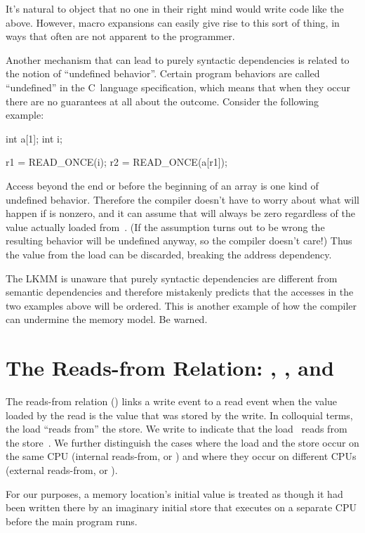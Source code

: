 It's natural to object that no one in their right mind would write
code like the above.
However, macro expansions can easily give rise to this sort of thing,
in ways that often are not apparent to the programmer.

Another mechanism that can lead to purely syntactic dependencies is
related to the notion of ``undefined behavior''.
Certain program behaviors are called ``undefined'' in the C~language
specification, which means that when they occur there are no
guarantees at all about the outcome.
Consider the following example:

\begin{VerbatimU}
	int a[1];
	int i;

	r1 = READ_ONCE(i);
	r2 = READ_ONCE(a[r1]);
\end{VerbatimU}

Access beyond the end or before the beginning of an array is one kind
of undefined behavior.
Therefore the compiler doesn't have to worry about what will happen
if  is nonzero, and it can assume that  will always be
zero regardless of the value actually loaded from~.
(If the assumption turns out to be wrong the resulting behavior will
be undefined anyway, so the compiler doesn't care!)
Thus the value from the load can be discarded, breaking the address
dependency.

The LKMM is unaware that purely syntactic dependencies are different
from semantic dependencies and therefore mistakenly predicts that the
accesses in the two examples above will be ordered.
This is another example of how the compiler can undermine the memory
model.
Be warned.


\section{The Reads-from Relation: , , and }
\label{sec:docs:explanation:The Reads-from Relation: rf, rfi, and rfe}

The reads-from relation () links a write event to a read event when
the value loaded by the read is the value that was stored by the
write.
In colloquial terms, the load ``reads from'' the store.
We write  to indicate that the load~ reads from
the store~.
We further distinguish the cases where the load and the store occur on
the same CPU (internal reads-from, or ) and where they occur on
different CPUs (external reads-from, or ).

For our purposes, a memory location's initial value is treated as
though it had been written there by an imaginary initial store that
executes on a separate CPU before the main program runs.

